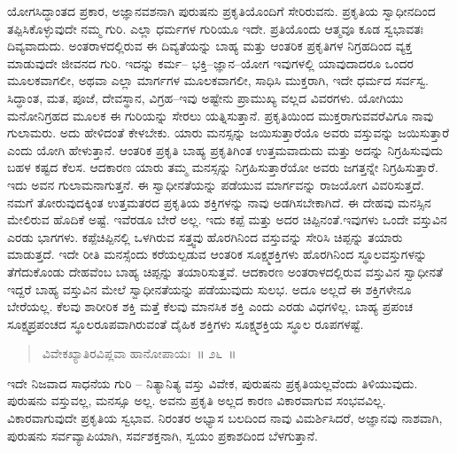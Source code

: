 ಯೋಗಸಿದ್ಧಾಂತದ ಪ್ರಕಾರ, ಅಜ್ಞಾನವಶನಾಗಿ ಪುರುಷನು ಪ್ರಕೃತಿಯೊಂದಿಗೆ ಸೇರಿರುವನು. ಪ್ರಕೃತಿಯ ಸ್ವಾಧೀನದಿಂದ ತಪ್ಪಿಸಿಕೊಳ್ಳುವುದೇ ನಮ್ಮ ಗುರಿ. ಎಲ್ಲಾ ಧರ್ಮಗಳ ಗುರಿಯೂ ಇದೇ. ಪ್ರತಿಯೊಂದು ಆತ್ಮವೂ ಕೂಡ ಸ್ವಭಾವತಃ ದಿವ್ಯವಾದುದು. ಅಂತರಾಳದಲ್ಲಿರುವ ಈ ದಿವ್ಯತೆಯನ್ನು ಬಾಹ್ಯ ಮತ್ತು ಆಂತರಿಕ ಪ್ರಕೃತಿಗಳ ನಿಗ್ರಹದಿಂದ ವ್ಯಕ್ತ ಮಾಡುವುದೇ ಜೀವನದ ಗುರಿ. ಇದನ್ನು ಕರ್ಮ– ಭಕ್ತಿ–ಜ್ಞಾನ–ಯೋಗ ಇವುಗಳಲ್ಲಿ ಯಾವುದಾದರೂ ಒಂದರ ಮೂಲಕವಾಗಲೀ, ಅಥವಾ ಎಲ್ಲಾ ಮಾರ್ಗಗಳ ಮೂಲಕವಾಗಲೀ, ಸಾಧಿಸಿ ಮುಕ್ತರಾಗಿ, ಇದೇ ಧರ್ಮದ ಸರ್ವಸ್ವ. ಸಿದ್ಧಾಂತ, ಮತ, ಪೂಜೆ, ದೇವಸ್ಥಾನ, ವಿಗ್ರಹ–ಇವು ಅಷ್ಟೇನು ಪ್ರಾಮುಖ್ಯ ವಲ್ಲದ ವಿವರಗಳು. ಯೋಗಿಯು ಮನೋನಿಗ್ರಹದ ಮೂಲಕ ಈ ಗುರಿಯನ್ನು ಸೇರಲು ಯತ್ನಿಸುತ್ತಾನೆ. ಪ್ರಕೃತಿಯಿಂದ ಮುಕ್ತರಾಗುವವರೆವಿಗೂ ನಾವು ಗುಲಾಮರು. ಅದು ಹೇಳಿದಂತೆ ಕೇಳಬೇಕು. ಯಾರು ಮನಸ್ಸನ್ನು ಜಯಿಸುತ್ತಾರೆಯೊ ಅವರು ವಸ್ತುವನ್ನು ಜಯಿಸುತ್ತಾರೆ ಎಂದು ಯೋಗಿ ಹೇಳುತ್ತಾನೆ. ಆಂತರಿಕ ಪ್ರಕೃತಿ ಬಾಹ್ಯ ಪ್ರಕೃತಿಗಿಂತ ಉತ್ತಮವಾದುದು ಮತ್ತು ಅದನ್ನು ನಿಗ್ರಹಿಸುವುದು ಬಹಳ ಕಷ್ಟದ ಕೆಲಸ. ಆದಕಾರಣ ಯಾರು ತಮ್ಮ ಮನಸ್ಸನ್ನು ನಿಗ್ರಹಿಸುತ್ತಾರೆಯೋ ಅವರು ಜಗತ್ತನ್ನೇ ನಿಗ್ರಹಿಸುತ್ತಾರೆ. ಇದು ಅವನ ಗುಲಾಮನಾಗುತ್ತನೆ. ಈ ಸ್ವಾಧೀನತೆಯನ್ನು ಪಡೆಯುವ ಮಾರ್ಗವನ್ನು ರಾಜಯೋಗ ವಿವರಿಸುತ್ತದೆ. ನಮಗೆ ತೋರುವುದಕ್ಕಿಂತ ಉತ್ತಮತರದ ಪ್ರಕೃತಿಯ ಶಕ್ತಿಗಳನ್ನು ನಾವು ಅಡಗಿಸಬೇಕಾಗಿದೆ. ಈ ದೇಹವು ಮನಸ್ಸಿನ ಮೇಲಿರುವ ಹೊದಿಕೆ ಅಷ್ಟೆ. ಇವೆರಡೂ ಬೇರೆ ಅಲ್ಲ. ಇದು ಕಪ್ಪೆ ಮತ್ತು ಅದರ ಚಿಪ್ಪಿನಂತೆ.\break ಇವುಗಳು ಒಂದೇ ವಸ್ತುವಿನ ಎರಡು ಭಾಗಗಳು. ಕಪ್ಪೆಚಿಪ್ಪಿನಲ್ಲಿ ಒಳಗಿರುವ ಸತ್ತ್ವವು ಹೊರಗಿನಿಂದ ವಸ್ತುವನ್ನು ಸೇರಿಸಿ ಚಿಪ್ಪನ್ನು ತಯಾರು ಮಾಡುತ್ತದೆ. ಇದೇ ರೀತಿ ಮನಸ್ಸೆಂದು ಕರೆಯಲ್ಪಡುವ ಆಂತರಿಕ ಸೂಕ್ಷ್ಮಶಕ್ತಿಗಳು ಹೊರಗಿನಿಂದ ಸ್ಥೂಲವಸ್ತುಗಳನ್ನು ತೆಗೆದುಕೊಂಡು ದೇಹವೆಂಬ ಬಾಹ್ಯ ಚಿಪ್ಪನ್ನು ತಯಾರಿಸುತ್ತವೆ. ಆದಕಾರಣ ಅಂತರಾಳದಲ್ಲಿರುವ ವಸ್ತುವಿನ ಸ್ವಾಧೀನತೆ ಇದ್ದರೆ ಬಾಹ್ಯ ವಸ್ತುವಿನ ಮೇಲೆ ಸ್ವಾಧೀನತೆಯನ್ನು ಪಡೆಯುವುದು ಸುಲಭ. ಅದೂ ಅಲ್ಲದೆ ಈ ಶಕ್ತಿಗಳೇನೂ ಬೇರೆಯಲ್ಲ. ಕೆಲವು ಶಾರೀರಿಕ ಶಕ್ತಿ ಮತ್ತೆ ಕೆಲವು ಮಾನಸಿಕ ಶಕ್ತಿ ಎಂದು ಎರಡು ವಿಧಗಳಿಲ್ಲ. ಬಾಹ್ಯ ಪ್ರಪಂಚ ಸೂಕ್ಷ್ಮಪ್ರಪಂಚದ ಸ್ಥೂಲರೂಪವಾಗಿರುವಂತೆ ದೈಹಿಕ ಶಕ್ತಿಗಳು ಸೂಕ್ಷ್ಮಶಕ್ತಿಯ ಸ್ಥೂಲ ರೂಪಗಳಷ್ಟೆ. 

\vspace{-0.2cm}

\begin{verse}
ವಿವೇಕಖ್ಯಾತಿರವಿಪ್ಲವಾ ಹಾನೋಪಾಯಃ~॥ ೨೬~॥
\end{verse}

\vspace{-0.45cm}


\vspace{0.2cm}

ಇದೇ ನಿಜವಾದ ಸಾಧನೆಯ ಗುರಿ – ನಿತ್ಯಾನಿತ್ಯ ವಸ್ತು ವಿವೇಕ, ಪುರುಷನು ಪ್ರಕೃತಿಯಲ್ಲವೆಂದು ತಿಳಿಯುವುದು. ಪುರುಷನು ವಸ್ತುವಲ್ಲ, ಮನಸ್ಸೂ ಅಲ್ಲ. ಅವನು ಪ್ರಕೃತಿ ಅಲ್ಲದ ಕಾರಣ ವಿಕಾರವಾಗುವ ಸಂಭವವಿಲ್ಲ. ವಿಕಾರವಾಗುವುದೇ ಪ್ರಕೃತಿಯ ಸ್ವಭಾವ. ನಿರಂತರ ಅಭ್ಯಾಸ ಬಲದಿಂದ ನಾವು ವಿಮರ್ಶಿಸಿದರೆ, ಅಜ್ಞಾನವು ನಾಶವಾಗಿ, ಪುರುಷನು ಸರ್ವವ್ಯಾಪಿಯಾಗಿ, ಸರ್ವಶಕ್ತನಾಗಿ, ಸ್ವಯಂ ಪ್ರಕಾಶದಿಂದ ಬೆಳಗುತ್ತಾನೆ. 

